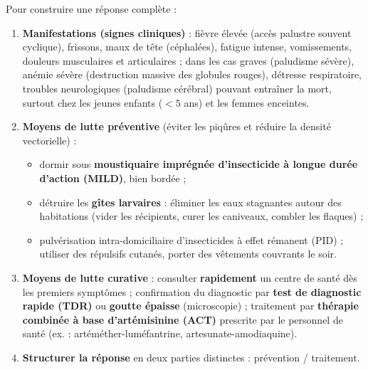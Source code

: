 \documentclass[11pt]{article}
\newcommand{\cle}[1]{{\popxbold\color{popdark}#1}}
\begin{document}
\begin{methode}
Pour construire une réponse complète :
\begin{enumerate}
\item \textbf{Manifestations (signes cliniques)} : \cle{fièvre élevée} (accès palustre souvent cyclique), frissons, maux de tête (céphalées), fatigue intense, vomissements, douleurs musculaires et articulaires ; dans les cas graves (paludisme sévère), anémie sévère (destruction massive des globules rouges), détresse respiratoire, troubles neurologiques (paludisme cérébral) pouvant entraîner la mort, surtout chez les jeunes enfants ($< 5$ ans) et les femmes enceintes.
\item \textbf{Moyens de lutte préventive} (éviter les piqûres et réduire la densité vectorielle) :
\begin{itemize}
\item dormir sous \textbf{moustiquaire imprégnée d'insecticide à longue durée d'action (MILD)}, bien bordée ;
\item détruire les \textbf{gîtes larvaires} : éliminer les eaux stagnantes autour des habitations (vider les récipients, curer les caniveaux, combler les flaques) ;
\item pulvérisation intra-domiciliaire d'insecticides à effet rémanent (PID) ; utiliser des répulsifs cutanés, porter des vêtements couvrants le soir.
\end{itemize}
\item \textbf{Moyens de lutte curative} : consulter \textbf{rapidement} un centre de santé dès les premiers symptômes ; confirmation du diagnostic par \textbf{test de diagnostic rapide (TDR)} ou \textbf{goutte épaisse} (microscopie) ; traitement par \textbf{thérapie combinée à base d'artémisinine (ACT)} prescrite par le personnel de santé (ex. : artéméther-luméfantrine, artesunate-amodiaquine).
\item \textbf{Structurer la réponse} en deux parties distinctes : prévention / traitement.
\end{enumerate}
\end{methode}
\end{document}
